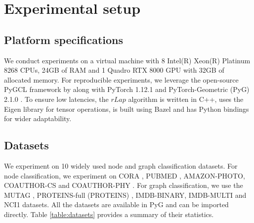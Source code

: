 \documentclass{article}
\theoremstyle{plain}
\theoremstyle{definition}
\theoremstyle{remark}
\begin{document}
\section{Experimental setup}
\label{appendix:experimental_setup}


\subsection{Platform specifications}
We conduct experiments on a virtual machine with 8 Intel(R) Xeon(R) Platinum 8268 CPUs, 24GB of RAM and 1 Quadro RTX 8000 GPU with 32GB of allocated memory. For reproducible experiments, we leverage the open-source PyGCL framework by \citet{zhu2021empirical} along with PyTorch 1.12.1 \citep{paszke2019pytorch} and PyTorch-Geometric (PyG) 2.1.0 \citep{Fey/Lenssen/2019}. To ensure low latencies, the $rLap$ algorithm is written in C++, uses the Eigen library for tensor operations, is built using Bazel and has Python bindings for wider adaptability.

\subsection{Datasets}
We experiment on 10 widely used node and graph classification datasets. For node classification, we experiment on CORA \citep{mccallum2000automating}, PUBMED \citep{sen2008collective}, AMAZON-PHOTO, COAUTHOR-CS and COAUTHOR-PHY \citep{shchur2018pitfalls}.
For graph classification, we use the MUTAG \citep{debnath1991structure}, PROTEINS-full (PROTEINS) \citep{borgwardt2005protein}, IMDB-BINARY, IMDB-MULTI \citep{yanardag2015deep} and NCI1 \citep{wale2008comparison} datasets. All the datasets are available in PyG and can be imported directly. Table \ref{table:datasets} provides a summary of their statistics.
\end{document}
